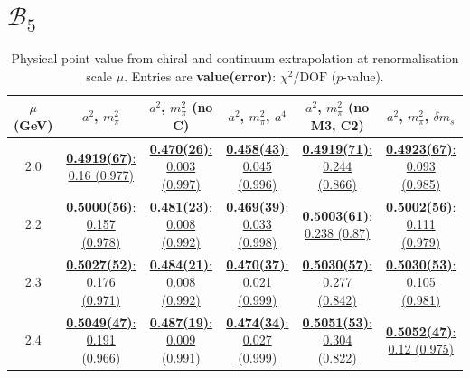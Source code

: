 \documentclass[12pt]{extarticle}
\begin{document}
\section{$\mathcal{B}_5$}
\begin{table}[h!]
\begin{center}
\begin{tabular}{|c|c|c|c|c|c|}
\hline
$\mu$ (GeV) & $a^2$, $m_\pi^2$& $a^2$, $m_\pi^2$ (no C)& $a^2$, $m_\pi^2$, $a^4$& $a^2$, $m_\pi^2$ (no M3, C2)& $a^2$, $m_\pi^2$, $\delta m_s$\\
\hline
2.0& \hyperlink{TT/SUSY/bag_a2m2_20.pdf.1}{\textbf{0.4919(67)}: 0.16 (0.977)} & \hyperlink{TT/SUSY/bag_a2m2noC_20.pdf.1}{\textbf{0.470(26)}: 0.003 (0.997)} & \hyperlink{TT/SUSY/bag_a2a4m2_20.pdf.1}{\textbf{0.458(43)}: 0.045 (0.996)} & \hyperlink{TT/SUSY/bag_a2m2mcut_20.pdf.1}{\textbf{0.4919(71)}: 0.244 (0.866)} & \hyperlink{TT/SUSY/bag_a2m2delm_20.pdf.1}{\textbf{0.4923(67)}: 0.093 (0.985)}\\
2.2& \hyperlink{TT/SUSY/bag_a2m2_22.pdf.1}{\textbf{0.5000(56)}: 0.157 (0.978)} & \hyperlink{TT/SUSY/bag_a2m2noC_22.pdf.1}{\textbf{0.481(23)}: 0.008 (0.992)} & \hyperlink{TT/SUSY/bag_a2a4m2_22.pdf.1}{\textbf{0.469(39)}: 0.033 (0.998)} & \hyperlink{TT/SUSY/bag_a2m2mcut_22.pdf.1}{\textbf{0.5003(61)}: 0.238 (0.87)} & \hyperlink{TT/SUSY/bag_a2m2delm_22.pdf.1}{\textbf{0.5002(56)}: 0.111 (0.979)}\\
2.3& \hyperlink{TT/SUSY/bag_a2m2_23.pdf.1}{\textbf{0.5027(52)}: 0.176 (0.971)} & \hyperlink{TT/SUSY/bag_a2m2noC_23.pdf.1}{\textbf{0.484(21)}: 0.008 (0.992)} & \hyperlink{TT/SUSY/bag_a2a4m2_23.pdf.1}{\textbf{0.470(37)}: 0.021 (0.999)} & \hyperlink{TT/SUSY/bag_a2m2mcut_23.pdf.1}{\textbf{0.5030(57)}: 0.277 (0.842)} & \hyperlink{TT/SUSY/bag_a2m2delm_23.pdf.1}{\textbf{0.5030(53)}: 0.105 (0.981)}\\
2.4& \hyperlink{TT/SUSY/bag_a2m2_24.pdf.1}{\textbf{0.5049(47)}: 0.191 (0.966)} & \hyperlink{TT/SUSY/bag_a2m2noC_24.pdf.1}{\textbf{0.487(19)}: 0.009 (0.991)} & \hyperlink{TT/SUSY/bag_a2a4m2_24.pdf.1}{\textbf{0.474(34)}: 0.027 (0.999)} & \hyperlink{TT/SUSY/bag_a2m2mcut_24.pdf.1}{\textbf{0.5051(53)}: 0.304 (0.822)} & \hyperlink{TT/SUSY/bag_a2m2delm_24.pdf.1}{\textbf{0.5052(47)}: 0.12 (0.975)}\\
\hline
\end{tabular}
\caption{Physical point value from chiral and continuum extrapolation at renormalisation scale $\mu$. Entries are \textbf{value(error)}: $\chi^2/\text{DOF}$ ($p$-value).}
\end{center}
\end{table}
\end{document}
